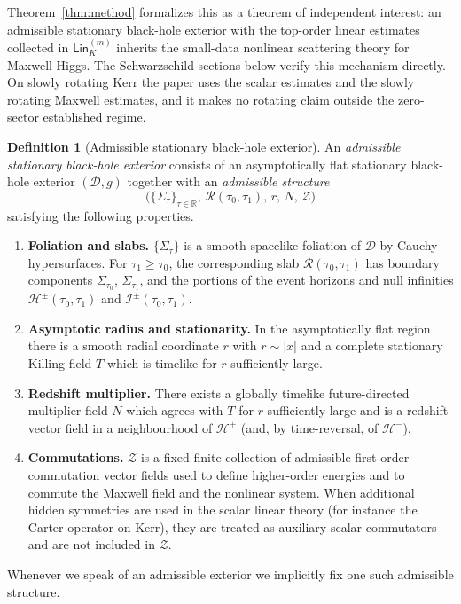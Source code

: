 \documentclass[11pt]{article}
\numberwithin{equation}{section}
\theoremstyle{plain}
\theoremstyle{definition}
\newtheorem{definition}{Definition}[section]
\theoremstyle{remark}
\newcommand{\Lin}{\mathsf{Lin}}
\begin{document}
Theorem~\ref{thm:method} formalizes this as a theorem of independent interest: an admissible stationary black-hole exterior with the top-order linear estimates collected in $\Lin_{K}^{(m)}$ inherits the small-data nonlinear scattering theory for Maxwell-Higgs.  The Schwarzschild sections below verify this mechanism directly.  On slowly rotating Kerr the paper uses the scalar estimates and the slowly rotating Maxwell estimates, and it makes no rotating claim outside the zero-sector established regime.

\medskip

%
\begin{definition}[Admissible stationary black-hole exterior]\label{def:admissible-exterior}
An \emph{admissible stationary black-hole exterior} consists of an asymptotically flat stationary black-hole exterior $(\mathcal D,g)$ together with an \emph{admissible structure}
\begin{equation}
\bigl(\{\Sigma_{\tau}\}_{\tau\in\mathbb R},\,\mathcal R(\tau_{0},\tau_{1}),\,r,\,N,\,\mathcal Z\bigr)
\end{equation}
satisfying the following properties.
\begin{enumerate}
\item[(G1)] \textbf{Foliation and slabs.}
$\{\Sigma_{\tau}\}$ is a smooth spacelike foliation of $\mathcal D$ by Cauchy hypersurfaces.
For $\tau_{1}\ge\tau_{0}$, the corresponding slab $\mathcal{R}(\tau_{0},\tau_{1})$ has boundary components
$\Sigma_{\tau_{0}}$, $\Sigma_{\tau_{1}}$, and the portions of the event horizons and null infinities
$\mathcal H^{\pm}(\tau_{0},\tau_{1})$ and $\mathcal I^{\pm}(\tau_{0},\tau_{1})$.
\item[(G2)] \textbf{Asymptotic radius and stationarity.}
In the asymptotically flat region there is a smooth radial coordinate $r$ with $r\sim |x|$ and a complete stationary Killing field $T$
which is timelike for $r$ sufficiently large.
\item[(G3)] \textbf{Redshift multiplier.}
There exists a globally timelike future-directed multiplier field $N$ which agrees with $T$ for $r$ sufficiently large
and is a redshift vector field in a neighbourhood of $\mathcal H^{+}$ (and, by time-reversal, of $\mathcal H^{-}$).
\item[(G4)] \textbf{Commutations.}
$\mathcal Z$ is a fixed finite collection of admissible first-order commutation vector fields used to define higher-order energies and to commute the Maxwell field and the nonlinear system. When additional hidden symmetries are used in the scalar linear theory (for instance the Carter operator on Kerr), they are treated as auxiliary scalar commutators and are not included in $\mathcal Z$.
\end{enumerate}
Whenever we speak of an admissible exterior we implicitly fix one such admissible structure.
\end{definition}
\end{document}
